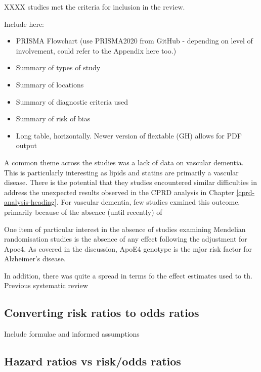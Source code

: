 \documentclass[a4paper, twoside]{templates/ociamthesis}
\begin{document}
XXXX studies met the criteria for inclusion in the review.

Include here:

\begin{itemize}
\item
  PRISMA Flowchart (use PRISMA2020 from GitHub - depending on level of involvement, could refer to the Appendix here too.)
\item
  Summary of types of study
\item
  Summary of locations
\item
  Summary of diagnostic criteria used
\item
  Summary of risk of bias
\item
  Long table, horizontally. Newer version of flextable (GH) allows for PDF output
\end{itemize}

A common theme across the studies was a lack of data on vascular dementia. This is particularly interesting as lipids and statins are primarily a vascular disease. There is the potential that they studies encountered similar difficulties in address the unexpected results observed in the CPRD analysis in Chapter \ref{cprd-analysis-heading}. For vascular dementia, few studies exmined this outcome, primarily because of the absence (until recently) of

One item of particular interest in the absence of studies examining Mendelian randomisation studies is the absence of any effect following the adjustment for Apoe4. As covered in the discussion, ApoE4 genotype is the mjor risk factor for Alzheimer's disease.

In addition, there was quite a spread in terms fo the effect estimates used to th. Previous systematic review

\hypertarget{converting-risk-ratios-to-odds-ratios}{%
\subsection{Converting risk ratios to odds ratios}\label{converting-risk-ratios-to-odds-ratios}}

Include formulae and informed assumptions

\hypertarget{hazard-ratios-vs-riskodds-ratios}{%
\subsection{Hazard ratios vs risk/odds ratios}\label{hazard-ratios-vs-riskodds-ratios}}
\end{document}
